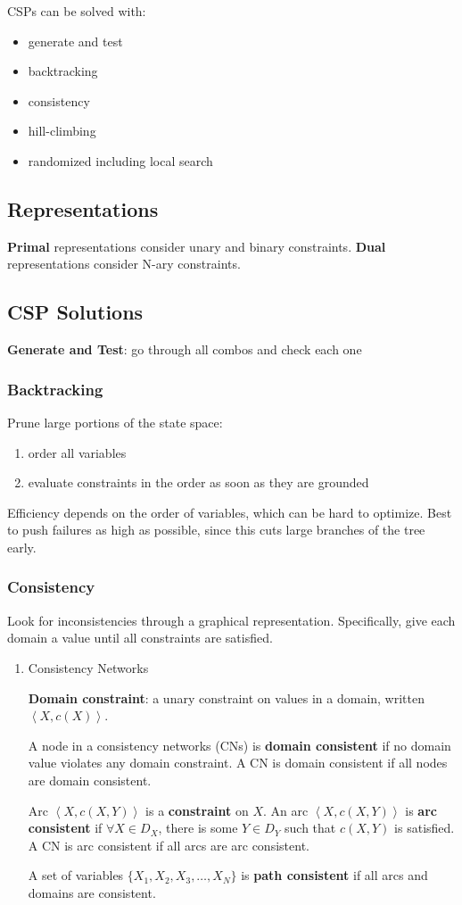 \documentclass[11pt]{article}
\begin{document}
CSPs can be solved with:
\begin{itemize}
\item generate and test
\item backtracking
\item consistency
\item hill-climbing
\item randomized including local search
\end{itemize}
\subsection{Representations}
\label{sec:orgd0bd889}
\textbf{Primal} representations consider unary and binary constraints.
\textbf{Dual} representations consider N-ary constraints.
\subsection{CSP Solutions}
\label{sec:org4b0b277}
\textbf{Generate and Test}: go through all combos and check each one
\subsubsection{Backtracking}
\label{sec:org2d5b530}
Prune large portions of the state space:
\begin{enumerate}
\item order all variables
\item evaluate constraints in the order as soon as they are grounded
\end{enumerate}

Efficiency depends on the order of variables, which can be hard to optimize.
Best to push failures as high as possible, since this cuts large branches of the tree early.
\subsubsection{Consistency}
\label{sec:orgefea526}
Look for inconsistencies through a graphical representation.
Specifically, give each domain a value until all constraints are satisfied.
\begin{enumerate}
\item Consistency Networks
\label{sec:org91a38dd}

\textbf{Domain constraint}: a unary constraint on values in a domain, written \(\left< X, c(X) \right>\).

A node in a consistency networks (CNs) is \textbf{domain consistent} if no domain value violates any domain constraint.
A CN is domain consistent if all nodes are domain consistent.

Arc \(\left< X, c(X, Y) \right>\) is a \textbf{constraint} on \(X\).
An arc \(\left< X, c(X, Y) \right>\) is \textbf{arc consistent} if \(\forall X \in D_{X}\), there is some
\(Y \in D_{Y}\) such that \(c(X, Y)\) is satisfied.
A CN is arc consistent if all arcs are arc consistent.

A set of variables \(\{ X_{1}, X_{2}, X_{3}, \dots, X_{N} \}\) is \textbf{path consistent} if all arcs
and domains are consistent.
\end{enumerate}
\end{document}
